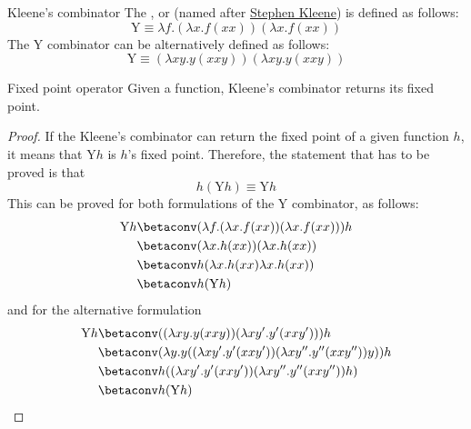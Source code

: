 \documentclass[a4paper, 12pt]{report}
\begin{document}
    \begin{frameddefn}{Kleene's combinator}
        The ,  or  (named after \href{https://it.wikipedia.org/wiki/Stephen_Kleene}{Stephen Kleene}) is defined as follows: $$\mathrm Y \equiv \lambda f.(\lambda x.f(xx))(\lambda x.f(xx))$$ The $\mathrm Y$ combinator can be alternatively defined as follows: $$\mathrm Y \equiv (\lambda xy. y(xxy))(\lambda xy.y(xxy))$$
    \end{frameddefn}

    \begin{framedprop}{Fixed point operator}
        Given a function, Kleene's combinator returns its fixed point.
    \end{framedprop}

    \begin{proof}
        If the Kleene's combinator can return the fixed point of a given function $h$, it means that $\mathrm Y h$ is $h$'s fixed point. Therefore, the statement that has to be proved is that $$h (\mathrm Y h) \equiv \mathrm Y h$$ This can be proved for both formulations of the $\mathrm Y$ combinator, as follows:
        \begin{equation*}
            \begin{split}
                \mathrm Y h &\betaconv (\lambda f .(\lambda x.f(xx)) (\lambda x.f(xx))) h \\
                            &\betaconv (\lambda x.h(xx))(\lambda x.h(xx)) \\
                            &\betaconv h(\lambda x.h(xx) \lambda x. h(xx)) \\
                            &\betaconv h (\mathrm Y h)
            \end{split}
        \end{equation*}
        and for the alternative formulation
        \begin{equation*}
            \begin{split}
                \mathrm Y h &\betaconv ((\lambda xy.y(xxy))(\lambda xy'.y'(xxy')))h \\
                            &\betaconv (\lambda y.y ((\lambda xy'.y'(xxy'))(\lambda xy''.y''(xxy''))y))h \\
                            &\betaconv h ((\lambda xy'.y'(xxy'))(\lambda xy''.y''(xxy''))h) \\
                            &\betaconv h(\mathrm Y h)
            \end{split}
        \end{equation*}
    \end{proof}
\end{document}
